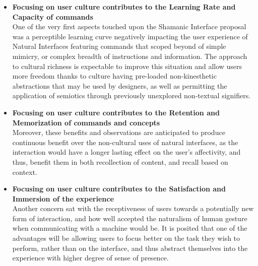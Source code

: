     \begin{itemize}
        \item \textbf{Focusing on user culture contributes to the Learning Rate and Capacity of commands}\\
            One of the very first aspects touched upon the Shamanic Interface proposal was a perceptible learning curve negatively impacting the user experience of Natural Interfaces featuring commands that scoped beyond of simple mimicry, or complex breadth of instructions and information. The approach to cultural richness is expectable to improve this situation and allow users more freedom thanks to culture having pre-loaded non-kinesthetic abstractions that may be used by designers, as well as permitting the application of semiotics through previously unexplored non-textual signifiers.
        
        \item \textbf{Focusing on user culture contributes to the Retention and Memorization of commands and concepts}\\
            Moreover, these benefits and observations are anticipated to produce continuous benefit over the non-cultural uses of natural interfaces, as the interaction would have a longer lasting effect on the user's affectivity, and thus, benefit them in both recollection of content, and recall based on context.
            
        \item \textbf{Focusing on user culture contributes to the Satisfaction and Immersion of the experience}\\
            Another concern sat with the receptiveness of users towards a potentially new form of interaction, and how well accepted the naturalism of human gesture when communicating with a machine would be. It is posited that one of the advantages will be allowing users to focus better on the task they wish to perform, rather than on the interface, and thus abstract themselves into the experience with higher degree of sense of presence.
            
    \end{itemize}


